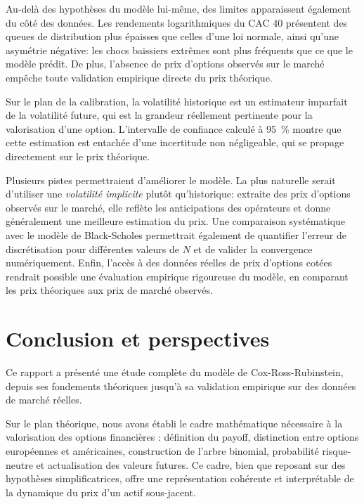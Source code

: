 \documentclass[11pt]{report}
\begin{document}
Au-delà des hypothèses du modèle lui-même, des limites apparaissent également
du côté des données. Les rendements logarithmiques du CAC 40 présentent des
queues de distribution plus épaisses que celles d'une loi normale, ainsi qu'une
asymétrie négative: les chocs baissiers extrêmes sont plus fréquents que ce
que le modèle prédit. De plus, l'absence de prix d'options observés sur le
marché empêche toute validation empirique directe du prix théorique.

Sur le plan de la calibration, la volatilité historique est un estimateur
imparfait de la volatilité future, qui est la grandeur réellement pertinente
pour la valorisation d'une option. L'intervalle de confiance calculé à 95~\%
montre que cette estimation est entachée d'une incertitude non négligeable,
qui se propage directement sur le prix théorique.

Plusieurs pistes permettraient d'améliorer le modèle. La plus naturelle serait
d'utiliser une \textit{volatilité implicite} plutôt qu'historique: extraite
des prix d'options observés sur le marché, elle reflète les anticipations des
opérateurs et donne généralement une meilleure estimation du prix. Une
comparaison systématique avec le modèle de Black-Scholes permettrait également
de quantifier l'erreur de discrétisation pour différentes valeurs de $N$ et
de valider la convergence numériquement. Enfin, l'accès à des données réelles
de prix d'options cotées rendrait possible une évaluation empirique rigoureuse
du modèle, en comparant les prix théoriques aux prix de marché observés.

\newpage


\chapter*{Conclusion et perspectives}

Ce rapport a présenté une étude complète du modèle de Cox-Ross-Rubinstein, depuis ses fondements théoriques jusqu'à sa validation empirique sur des données de marché réelles.

Sur le plan théorique, nous avons établi le cadre mathématique nécessaire à la valorisation des options financières : définition du payoff, distinction entre options européennes et américaines, construction de l'arbre binomial, probabilité risque-neutre et actualisation des valeurs futures. Ce cadre, bien que reposant sur des hypothèses simplificatrices, offre une représentation cohérente et interprétable de la dynamique du prix d'un actif sous-jacent.
\end{document}
